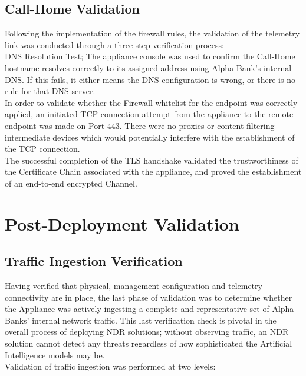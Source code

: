 \documentclass[12pt,a4paper]{report}
\begin{document}
\subsection{Call-Home Validation}

Following the implementation of the firewall rules, the validation of the telemetry link was conducted through a three-step verification process:\\

DNS Resolution Test; The appliance console was used to confirm the Call-Home hostname resolves correctly to its assigned address using Alpha Bank's internal DNS. If this fails, it either means the DNS configuration is wrong, or there is no rule for that DNS server.\\

In order to validate whether the Firewall whitelist for the endpoint was correctly applied, an initiated TCP connection attempt from the appliance to the remote endpoint was made on Port 443. There were no proxies or content filtering intermediate devices which would potentially interfere with the establishment of the TCP connection.\\

The successful completion of the TLS handshake validated the trustworthiness of the Certificate Chain associated with the appliance, and proved the establishment of an end-to-end encrypted Channel.
\section{Post-Deployment Validation}

\subsection{Traffic Ingestion Verification}

Having verified that physical, management configuration and telemetry connectivity are in place, the last phase of validation was to determine whether the Appliance was actively ingesting a complete and representative set of Alpha Banks’ internal network traffic. This last verification check is pivotal in the overall process of deploying NDR solutions; without observing traffic, an NDR solution cannot detect any threats regardless of how sophisticated the Artificial Intelligence models may be.\\

\noindent Validation of traffic ingestion was performed at two levels:
\end{document}
